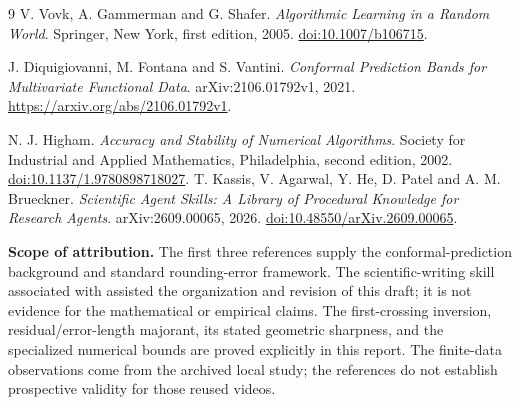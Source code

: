 \documentclass[11pt]{article}
\theoremstyle{noteplain}
\begin{document}
\begin{thebibliography}{9}
V. Vovk, A. Gammerman and G. Shafer.
\emph{Algorithmic Learning in a Random World}.
Springer, New York, first edition, 2005.
\href{https://doi.org/10.1007/b106715}{doi:10.1007/b106715}.

J. Diquigiovanni, M. Fontana and S. Vantini.
\emph{Conformal Prediction Bands for Multivariate Functional Data}.
arXiv:2106.01792v1, 2021.
\url{https://arxiv.org/abs/2106.01792v1}.

N. J. Higham.
\emph{Accuracy and Stability of Numerical Algorithms}.
Society for Industrial and Applied Mathematics, Philadelphia,
second edition, 2002.
\href{https://doi.org/10.1137/1.9780898718027}{doi:10.1137/1.9780898718027}.
T. Kassis, V. Agarwal, Y. He, D. Patel and A. M. Brueckner.
\emph{Scientific Agent Skills: A Library of Procedural Knowledge for Research Agents}.
arXiv:2609.00065, 2026.
\href{https://doi.org/10.48550/arXiv.2609.00065}{doi:10.48550/arXiv.2609.00065}.
\end{thebibliography}

\textbf{Scope of attribution.}
The first three references supply the conformal-prediction background and standard rounding-error framework. The scientific-writing skill associated with \cite{kassis2026} assisted the organization and revision of this draft; it is not evidence for the mathematical or empirical claims. The first-crossing inversion, residual/error-length majorant, its stated geometric sharpness, and the specialized numerical bounds are proved explicitly in this report. The finite-data observations come from the archived local study; the references do not establish prospective validity for those reused videos.
\end{document}
